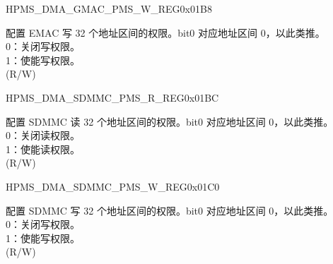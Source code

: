 \begin{register}{H}{PMS\_DMA\_GMAC\_PMS\_W\_REG}{0x01B8}\label{regdesc:PMSDMAGMACPMSWREG}
%
\regnewline%
\begin{regdesc}\begin{reglist}
\label{fielddesc:PMSDMAGMACWPMS}\item [PMS\_DMA\_GMAC\_W\_PMS] 配置 EMAC 写 32 个地址区间的权限。bit0 对应地址区间 0，以此类推。\\
0：关闭写权限。\\
1：使能写权限。\\ (R/W)
\end{reglist}\end{regdesc}
\end{register}


\begin{register}{H}{PMS\_DMA\_SDMMC\_PMS\_R\_REG}{0x01BC}\label{regdesc:PMSDMASDMMCPMSRREG}
%
\regnewline%
\begin{regdesc}\begin{reglist}
\label{fielddesc:PMSDMASDMMCRPMS}\item [PMS\_DMA\_SDMMC\_R\_PMS] 配置 SDMMC 读 32 个地址区间的权限。bit0 对应地址区间 0，以此类推。\\
0：关闭读权限。\\
1：使能读权限。\\ (R/W)
\end{reglist}\end{regdesc}
\end{register}


\begin{register}{H}{PMS\_DMA\_SDMMC\_PMS\_W\_REG}{0x01C0}\label{regdesc:PMSDMASDMMCPMSWREG}
%
\regnewline%
\begin{regdesc}\begin{reglist}
\label{fielddesc:PMSDMASDMMCWPMS}\item [PMS\_DMA\_SDMMC\_W\_PMS] 配置 SDMMC 写 32 个地址区间的权限。bit0 对应地址区间 0，以此类推。\\
0：关闭写权限。\\
1：使能写权限。\\ (R/W)
\end{reglist}\end{regdesc}
\end{register}


